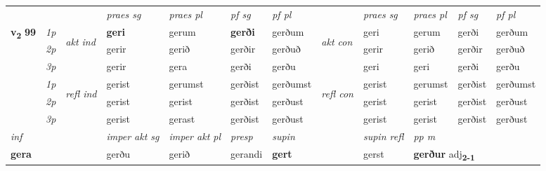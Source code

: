 \begin{longtable}[l]{X>{\footnotesize\itshape}llXXXXlXXXX}
 & &   & \textit{praes sg}  & \textit{praes pl}    & \textit{ pf sg} & \textit{pf pl} & & \textit{praes sg}  & \textit{praes pl}    & \textit{pf sg} & \textit{pf pl }  \\ \cmidrule{4-7} \cmidrule{9-12}
 \multirow{2}{*}{{{\textbf{v{\textsubscript{2}}} \Large{\textbf{99}}}}}  & 1p & \multirow{3}{*}{\begin{turn}{90}\textit{akt ind}\end{turn}} & \textbf{geri} & gerum & \textbf{gerði} & gerðum & \multirow{3}{*}{\begin{turn}{90}\textit{akt con}\end{turn}} &geri & gerum & gerði & gerðum\\*
 & 2p &  &  gerir  & gerið & gerðir & gerðuð & & gerir & gerið & gerðir & gerðuð \\*
 & 3p &  & gerir & gera & gerði & gerðu & & geri & geri& gerði & gerðu \\*
\cmidrule{4-7} \cmidrule{9-12}
 & 1p & \multirow{3}{*}{\begin{turn}{90}\textit{refl ind}\end{turn}}  & gerist & gerumst & gerðist & gerðumst & \multirow{3}{*}{\begin{turn}{90}\textit{refl con}\end{turn}}  &gerist & gerumst & gerðist & gerðumst \\*
 & 2p &  & gerist & gerist & gerðist & gerðust & &gerist & gerist & gerðist & gerðust \\*
 & 3p  & & gerist & gerast & gerðist & gerðust & & gerist & gerist& gerðist & gerðust \\*
\cmidrule{4-7} \cmidrule{9-12}

 {\textit{inf}} & &  & \textit{imper akt sg} & \textit{imper akt pl}   & \textit{presp} & \textit{supin} && \textit{supin refl} & \textit{pp m} \\*
 {\textbf{gera}} & && gerðu  & gerið   & gerandi &  \textbf{gert} && gerst & \multicolumn{2}{l}{\textbf{gerður} adj\textbf{\textsubscript{2-1}}} \\*
\midrule


\end{longtable}
